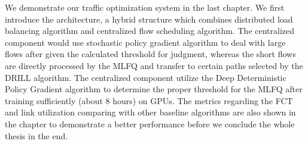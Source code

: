 \begin{bigabstract}
We demonstrate our traffic optimization system in the last chapter. We first introduce the architecture, a hybrid structure which combines distributed load balancing algorithm and centralized flow scheduling algorithm. The centralized component would use stochastic policy gradient algorithm to deal with large flows after given the calculated threshold for judgment, whereas the short flows are directly processed by the MLFQ and transfer to certain paths selected by the DRILL algorithm. The centralized component utilize the Deep Deterministic Policy Gradient algorithm to determine the proper threshold for the MLFQ after training sufficiently (about 8 hours) on GPUs. The metrics regarding the FCT and link utilization comparing with other baseline algorithms are also shown in the chapter to demonstrate a better performance before we conclude the whole thesis in the end.

\end{bigabstract}